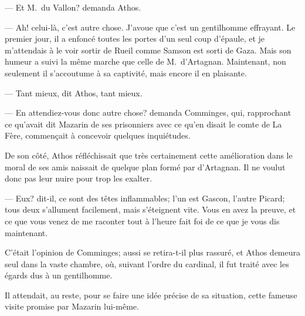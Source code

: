 — Et M.~du Vallon? demanda Athos.

— Ah! celui-là, c'est autre chose. J'avoue que c'est un gentilhomme effrayant. Le premier jour, il a enfoncé toutes les portes d'un seul coup d'épaule, et je m'attendais à le voir sortir de Rueil comme Samson est sorti de Gaza. Mais son humeur a suivi la même marche que celle de M.~d'Artagnan. Maintenant, non seulement il s'accoutume à sa captivité, mais encore il en plaisante.

— Tant mieux, dit Athos, tant mieux.

— En attendiez-vous donc autre chose? demanda Comminges, qui, rapprochant ce qu'avait dit Mazarin de ses prisonniers avec ce qu'en disait le comte de La Fère, commençait à concevoir quelques inquiétudes.

De son côté, Athos réfléchissait que très certainement cette amélioration dans le moral de ses amis naissait de quelque plan formé par d'Artagnan. Il ne voulut donc pas leur nuire pour trop les exalter.

— Eux? dit-il, ce sont des têtes inflammables; l'un est Gascon, l'autre Picard; tous deux s'allument facilement, mais s'éteignent vite. Vous en avez la preuve, et ce que vous venez de me raconter tout à l'heure fait foi de ce que je vous dis maintenant.

C'était l'opinion de Comminges; aussi se retira-t-il plus rassuré, et Athos demeura seul dans la vaste chambre, où, suivant l'ordre du cardinal, il fut traité avec les égards dus à un gentilhomme.

Il attendait, au reste, pour se faire une idée précise de sa situation, cette fameuse visite promise par Mazarin lui-même.